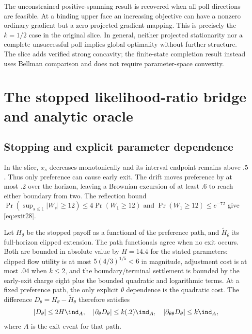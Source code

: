 The unconstrained positive-spanning result is recovered when all poll directions are feasible. At a binding upper face an increasing objective can have a nonzero ordinary gradient but a zero projected-gradient mapping. This is precisely the $k=1/2$ case in the original slice. In general, neither projected stationarity nor a complete unsuccessful poll implies global optimality without further structure. The slice adds verified strong concavity; the finite-state completion result instead uses Bellman comparison and does not require parameter-space convexity.

\section{The stopped likelihood-ratio bridge and analytic oracle}\label{app:slice28}
\subsection{Stopping and explicit parameter dependence}
In the slice, $x_s$ decreases monotonically and its interval endpoint remains above $.5$. Thus only preference can cause early exit. The drift moves preference by at most $.2$ over the horizon, leaving a Brownian excursion of at least $.6$ to reach either boundary from two. The reflection bound $\Pr(\sup_{s\le1}|W_s|\ge12)\le4\Pr(W_1\ge12)$ and $\Pr(W_1\ge12)\le e^{-72}$ give \eqref{eq:exit28}.

Let $H_\theta$ be the stopped payoff as a functional of the preference path, and $\widetilde H_\theta$ its full-horizon clipped extension. The path functionals agree when no exit occurs. Both are bounded in absolute value by $H=14.4$ for the stated parameters: clipped flow utility is at most $5(4/3)^{1/5}<6$ in magnitude, adjustment cost is at most $.04$ when $k\le2$, and the boundary/terminal settlement is bounded by the early-exit charge eight plus the bounded quadratic and logarithmic terms. At a fixed preference path, the only explicit $\theta$ dependence is the quadratic cost. The difference $D_\theta=H_\theta-\widetilde H_\theta$ therefore satisfies
\begin{equation}
 |D_\theta|\le2H\ind_A,\quad
 |\partial_\theta D_\theta|\le k(.2)\ind_A,\quad
 |\partial_{\theta\theta}D_\theta|\le k\ind_A,
\end{equation}
where $A$ is the exit event for that path.

